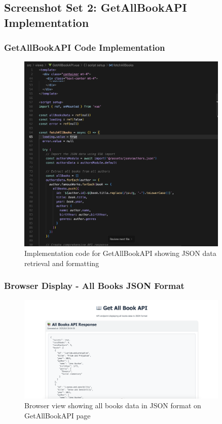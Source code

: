 \documentclass[12pt,a4paper]{article}
\begin{document}
\subsection{Screenshot Set 2: GetAllBookAPI Implementation}

\subsubsection{GetAllBookAPI Code Implementation}
\begin{figure}[H]
\centering
\includegraphics[width=0.9\textwidth]{getallbook_api_code.png}
\caption{Implementation code for GetAllBookAPI showing JSON data retrieval and formatting}
\end{figure}

\subsubsection{Browser Display - All Books JSON Format}
\begin{figure}[H]
\centering
\includegraphics[width=0.9\textwidth]{all_books_json_browser.png}
\caption{Browser view showing all books data in JSON format on GetAllBookAPI page}
\end{figure}
\end{document}

